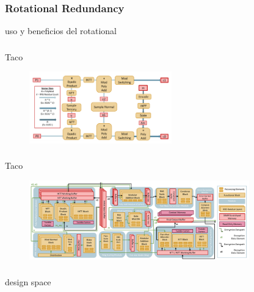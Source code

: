 \documentclass[10pt,handout]{beamer}
\begin{document}


\begin{frame}
\frametitle{Rotational Redundancy}
uso y beneficios del rotational

\end{frame}


\begin{frame}
\frametitle{}
Taco

\begin{figure}
    \includegraphics[width=0.55\textwidth]{pipeline.png}
\end{figure}

\end{frame}


\begin{frame}
\frametitle{}
Taco

\begin{figure}
    \includegraphics[width=0.85\textwidth]{architecture.png}
\end{figure}

\end{frame}




\begin{frame}
\frametitle{}
design space
\end{frame}

\end{document}
